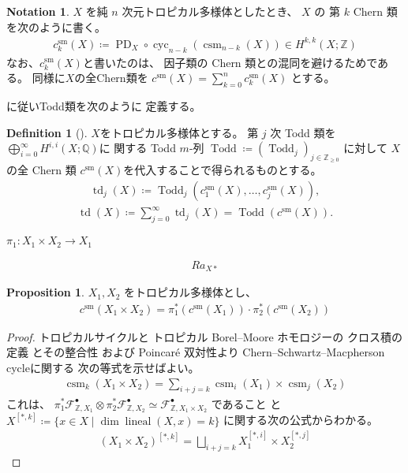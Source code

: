 \documentclass[a4paper,dvipdfmx,reqno,12pt]{amsart}
\theoremstyle{definition}
\newtheorem{definition}[theorem]{Definition}
\newtheorem{proposition}[theorem]{Proposition}
\newtheorem{notation}[theorem]{Notation}
\newcommand{\deq}{\coloneqq}
\newcommand{\opn}[1]{\operatorname{#1}}
\numberwithin{equation}{section}
\begin{document}
\begin{notation}
$X$ を純 $n$ 次元トロピカル多様体としたとき、
$X$ の 第 $k$ Chern 類を次のように書く。 
\begin{align}
c_{k}^{\mathrm{sm}}(X)\deq
\opn{PD}_X\circ \opn{cyc}_{n-k}(\opn{csm}_{n-k}(X))
\in H^{k,k}(X;\mathbb{Z})
\end{align}
なお、$c_{k}^{\mathrm{sm}}(X)$と書いたのは、
因子類の Chern 類との混同を避けるためである。
同様に$X$の全Chern類を
$c^{\mathrm{sm}}(X)=\sum_{k=0}^{n} c_{k}^{\mathrm{sm}}(X)$
とする。
\end{notation}
\cite{demedrano2023chern}に従いTodd類を次のように
定義する。
\begin{definition}[{\cite{demedrano2023chern}}]
$X$をトロピカル多様体とする。
第 $j$ 次 Todd 類を
$\bigoplus_{i=0}^{\infty} H^{i,i}(X;\mathbb{Q})$に
関する Todd $m$-列 $\opn{Todd}\deq (\opn{Todd}_j)_{j\in \mathbb{Z}_{\geq 0}}$
に対して
$X$ の全 Chern 類
$c^{\mathrm{sm}}(X)$を代入することで得られるものとする。
\begin{align}
\opn{td}_j(X)\deq \opn{Todd}_j(c_{1}^{\mathrm{sm}}(X),
\ldots,c_{j}^{\mathrm{sm}}(X)),
\end{align}
\begin{align}
\opn{td}(X)\deq \sum_{j=0}^{\infty}\opn{td}_j(X)=
\opn{Todd}(c^{\mathrm{sm}}(X)).
\end{align}

\end{definition}

$\pi_1\colon X_1\times X_2 \to X_1$

\begin{align}
Ra_{X*}
\end{align}

\begin{proposition}
$X_1,X_2$ をトロピカル多様体とし、
\begin{align}
c^{\mathrm{sm}}(X_1\times X_2)=
\pi^{*}_1(c^{\mathrm{sm}}(X_1))\cdot 
\pi^{*}_2(c^{\mathrm{sm}}(X_2))
\end{align}

\end{proposition}

\begin{proof}
トロピカルサイクルと
トロピカル
Borel--Moore ホモロジーの
クロス積の定義
\cite[Definition 3.7, 
Definition 4.15]{gross2019sheaftheoretic}
とその整合性
\cite[Proposition 5.9]{gross2019sheaftheoretic}
および Poincar\'e 双対性より
Chern--Schwartz--Macpherson cycleに関する
次の等式を示せばよい。
\begin{align}
\opn{csm}_k(X_1\times X_2)=\sum_{i+j=k}
\opn{csm}_{i}(X_1)\times \opn{csm}_{j}(X_2)
\end{align}
これは、
$\pi_1^{*}\mathcal{F}^{\bullet}_{\mathbb{Z},X_1}\otimes
\pi_2^{*}\mathcal{F}^{\bullet}_{\mathbb{Z},X_2}
\simeq \mathcal{F}^{\bullet}_{\mathbb{Z},X_1\times X_2}$
であること\cite[Lemma 4.14]{gross2019sheaftheoretic}
と
$X^{[*,k]}\deq \{x\in X\mid \dim \opn{lineal}(X,x)=k\}$
に関する次の公式からわかる。
\begin{align}
(X_1\times X_2)^{[*,k]}=\bigsqcup_{i+j=k}
X_1^{[*,i]}\times X_2^{[*,j]}
\end{align}

\end{proof}
\end{document}
